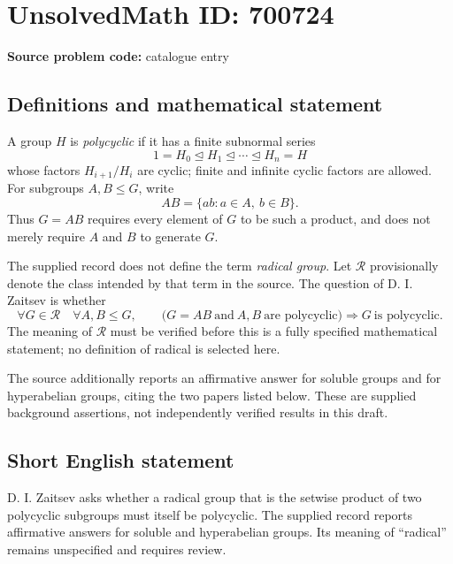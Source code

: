 \documentclass[11pt]{article}
\begin{document}
\section*{UnsolvedMath ID: 700724}
\textbf{Source problem code:} catalogue entry
\subsection{Definitions and mathematical statement}
A group \(H\) is \emph{polycyclic} if it has a finite subnormal series
\[
1=H_0\trianglelefteq H_1\trianglelefteq\cdots\trianglelefteq H_n=H
\]
whose factors \(H_{i+1}/H_i\) are cyclic; finite and infinite cyclic factors are allowed. For subgroups \(A,B\leq G\), write
\[
AB=\{ab:a\in A,\ b\in B\}.
\]
Thus \(G=AB\) requires every element of \(G\) to be such a product, and does not merely require \(A\) and \(B\) to generate \(G\).

The supplied record does not define the term \emph{radical group}. Let \(\mathcal R\) provisionally denote the class intended by that term in the source. The question of D. I. Zaitsev is whether
\[
\forall G\in\mathcal R\quad\forall A,B\leq G,\qquad
\bigl(G=AB\ \text{and}\ A,B\ \text{are polycyclic}\bigr)
\Longrightarrow G\ \text{is polycyclic}.
\]
The meaning of \(\mathcal R\) must be verified before this is a fully specified mathematical statement; no definition of radical is selected here.

The source additionally reports an affirmative answer for soluble groups and for hyperabelian groups, citing the two papers listed below. These are supplied background assertions, not independently verified results in this draft.
\subsection{Short English statement}
D. I. Zaitsev asks whether a radical group that is the setwise product of two polycyclic subgroups must itself be polycyclic. The supplied record reports affirmative answers for soluble and hyperabelian groups. Its meaning of ``radical'' remains unspecified and requires review.
\end{document}
